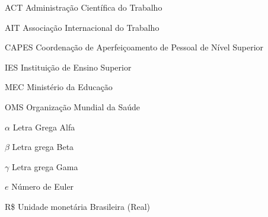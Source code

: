 	
	
	\listoffigures*
	\newpage
	
	
	\listoftables*
	\newpage
	
	
	
	\begin{siglas}
		\item [ACT]	Administração Científica do Trabalho 
		\item [AIT]	Associação Internacional do Trabalho 
		\item [CAPES]	Coordenação de Aperfeiçoamento de Pessoal de Nível Superior 
		\item [IES]	Instituição de Ensino Superior 
		\item [MEC]	Ministério da Educação 
		\item [OMS]	Organização Mundial da Saúde
	\end{siglas}  
	
	
	
	
	\begin{simbolos}
		\item[$\alpha$] Letra Grega Alfa
		\item[$\beta$] Letra grega Beta
		\item[$\gamma$] Letra grega Gama
		\item[$e$] Número de Euler
		\item[R\$] Unidade monetária Brasileira (Real)
	\end{simbolos}
	
